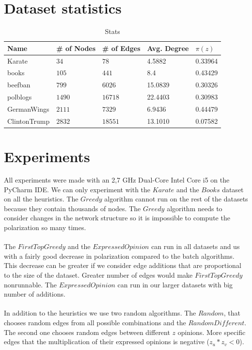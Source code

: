 \section{Dataset statistics}
\label{sec:stats}

\begin{table}[H]
 \centering
 \caption{Stats}
 \label{tab:statistics}
 \begin{tabular}{| l || l | l | l | l |}
 \hline
  Name & \# of Nodes & \# of Edges & Avg. Degree & $\pi(z)$\\
  \hline
  \hline
  Karate & $34$ & $78$ & 4.5882 &  0.33964\\
  \hline
    books & $105$ & $441$ & 8.4 &  0.43429\\
  \hline
    beefban & $799$ & $6026$ & 15.0839 &  0.30326\\
  \hline
  polblogs & $1490$ & $16718$ & 22.4403 &  0.30983\\
  \hline
  GermanWings & $2111$ & $7329$ & 6.9436 &  0.44479\\
  \hline
  ClintonTrump & $2832$ & $18551$ & 13.1010 &  0.07582\\
  \hline
 \end{tabular}
 \end{table}
 
\vspace{20pt}
\clearpage

\section{Experiments}
\label{sec:experim}

All experiments were made with an 2,7 GHz Dual-Core Intel Core i5 on the PyCharm IDE. We can only experiment with the $Karate$ and the $Books$ dataset on all the heuristics. The $Greedy$ algorithm cannot run on the rest of the datasets because they contain thousands of nodes. The $Greedy$ algorithm needs to consider changes in the network structure so it is impossible to compute the polarization so many times.
\\
\\ 
The $FirstTopGreedy$ and the $Expressed Opinion$ can run in all datasets and us with a fairly good decrease in polarization compared to the batch algorithms. This decrease can be greater if we consider edge additions that are proportional to the size of the dataset. Greater number of edges would make $FirstTopGreedy$ nonrunnable. The $Expressed Opinion$ can run in our larger datasets with big number of additions.
\\
\\
In addition to the heuristics we use two random algorithms. The $Random$, that chooses random edges from all possible combinations and the $RandomDifferent$. The second one chooses random edges between different $z$ opinions. More specific edges that the multiplication of their expressed opinions is negative ($z_u*z_v < 0$). 
\clearpage


